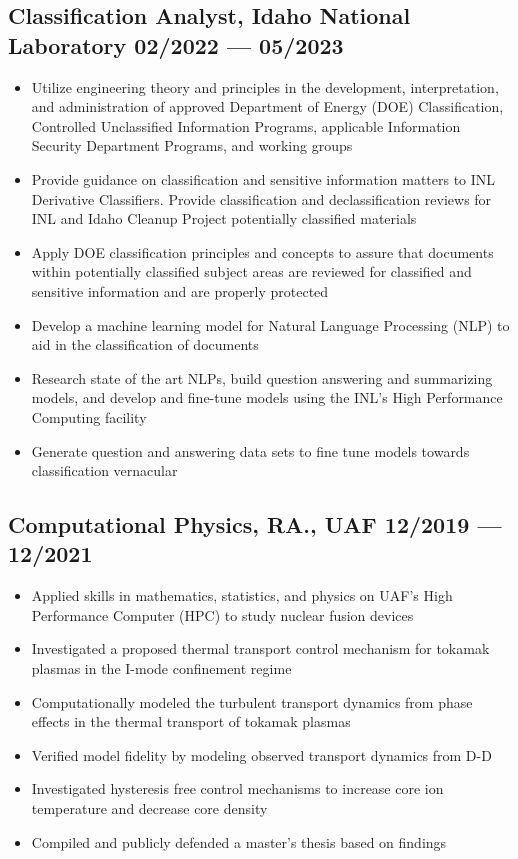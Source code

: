 \documentclass[letterpaper,11pt]{article}
\begin{document}
\subsection*{{\color{cvblue}Classification Analyst, Idaho National Laboratory } \hfill 02/2022 — 05/2023} 
 
\begin{itemize}
    \setlength{\itemsep}{-.5pt}
\item  Utilize engineering theory and principles in the development, interpretation, and administration of approved Department of Energy (DOE) Classification, Controlled Unclassified Information Programs, applicable Information
Security Department Programs, and working groups
\item  Provide guidance on classification and sensitive information matters to INL Derivative Classifiers. Provide classification and declassification reviews for INL and Idaho Cleanup Project potentially classified materials
\item  Apply DOE classification principles and concepts to assure that documents within potentially classified subject areas are reviewed for classified and sensitive information and are properly protected
\item  Develop a machine learning model for Natural Language Processing (NLP) to aid in the classification of documents
\item  Research state of the art NLPs, build question answering and summarizing models, and develop and fine-tune models using the INL’s High Performance Computing facility
\item  Generate question and answering data sets to fine tune models towards classification vernacular
\end{itemize}






\subsection*{{\color{cvblue}Computational Physics, RA., UAF } \hfill 12/2019 --- 12/2021} 
    \begin{itemize}
    \setlength{\itemsep}{-.5pt}
    \item Applied skills in mathematics, statistics, and physics on UAF's High Performance Computer (HPC) to study nuclear fusion devices  
\item Investigated a proposed thermal transport control mechanism for tokamak plasmas in the I-mode confinement regime 
\item Computationally modeled the turbulent transport dynamics from phase effects in the thermal transport of tokamak plasmas
\item Verified model fidelity by modeling observed transport dynamics from D-D
\item Investigated hysteresis free control mechanisms to increase core ion temperature and decrease core density 
\item Compiled and publicly defended a master's thesis based on findings
    \end{itemize}
\end{document}
